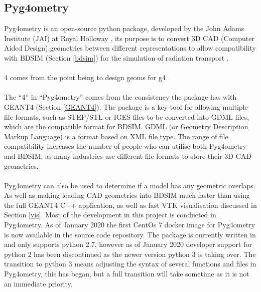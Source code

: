 \documentclass[12pt,a4paper]{article}
\begin{document}
\subsection{Pyg4ometry}
\label{pyg}
Pyg4ometry is an open-source python package, developed by the John Adams Institute (JAI) at Royal Holloway \cite{jai}, its purpose is to convert 3D CAD (Computer Aided Design) geometries between different representations to allow compatibility with BDSIM (Section \ref{bdsim}) for the simulation of radiation transport \cite{pyg4om}. \\
\\
4 comes from the point being to design geoms for g4\\
\\
The ``4'' in ``Pyg4ometry'' comes from the consistency the package has with GEANT4 (Section \ref{GEANT4}). The package is a key tool for allowing multiple file formats, such as STEP/STL or IGES files to be converted into GDML files, which are the compatible format for BDSIM. GDML (or Geometry Description Markup Language) is a format based on XML file type. The range of file compatibility increases the number of people who can utilise both Pyg4ometry and BDSIM, as many industries use different file formats to store their 3D CAD geometries.
\\\\
\noindent Pyg4ometry can also be used to determine if a model has any geometric overlaps. 
As well as making loading CAD geometries into BDSIM much faster than using the full GEANT4 C++ application, as well as fast VTK visualisation discussed in Section \ref{vis}. Most of the development in this project is conducted in Pyg4ometry. As of January 2020 the first CentOs 7 docker image for Pyg4ometry is now available in the source code repository. The package is currently written in and only supports python 2.7, however as of January 2020 developer support for python 2 has been discontinued as the newer version python 3 is taking over. The transition to python 3 means adjusting the syntax of several functions and files in Pyg4ometry, this has began, but a full transition will take sometime as it is not an immediate priority. 
\end{document}
